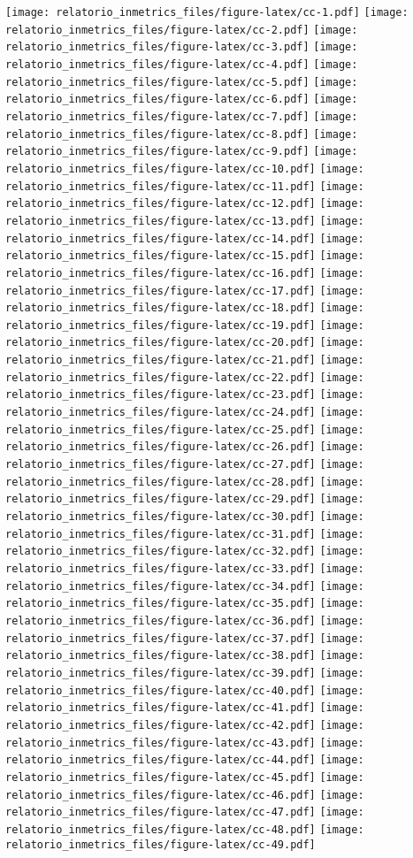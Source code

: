 \documentclass[]{book}
\begin{document}
\texttt{[image: relatorio\_inmetrics\_files/figure-latex/cc-1.pdf]} \texttt{[image: relatorio\_inmetrics\_files/figure-latex/cc-2.pdf]} \texttt{[image: relatorio\_inmetrics\_files/figure-latex/cc-3.pdf]} \texttt{[image: relatorio\_inmetrics\_files/figure-latex/cc-4.pdf]} \texttt{[image: relatorio\_inmetrics\_files/figure-latex/cc-5.pdf]} \texttt{[image: relatorio\_inmetrics\_files/figure-latex/cc-6.pdf]} \texttt{[image: relatorio\_inmetrics\_files/figure-latex/cc-7.pdf]} \texttt{[image: relatorio\_inmetrics\_files/figure-latex/cc-8.pdf]} \texttt{[image: relatorio\_inmetrics\_files/figure-latex/cc-9.pdf]} \texttt{[image: relatorio\_inmetrics\_files/figure-latex/cc-10.pdf]} \texttt{[image: relatorio\_inmetrics\_files/figure-latex/cc-11.pdf]} \texttt{[image: relatorio\_inmetrics\_files/figure-latex/cc-12.pdf]} \texttt{[image: relatorio\_inmetrics\_files/figure-latex/cc-13.pdf]} \texttt{[image: relatorio\_inmetrics\_files/figure-latex/cc-14.pdf]} \texttt{[image: relatorio\_inmetrics\_files/figure-latex/cc-15.pdf]} \texttt{[image: relatorio\_inmetrics\_files/figure-latex/cc-16.pdf]} \texttt{[image: relatorio\_inmetrics\_files/figure-latex/cc-17.pdf]} \texttt{[image: relatorio\_inmetrics\_files/figure-latex/cc-18.pdf]} \texttt{[image: relatorio\_inmetrics\_files/figure-latex/cc-19.pdf]} \texttt{[image: relatorio\_inmetrics\_files/figure-latex/cc-20.pdf]} \texttt{[image: relatorio\_inmetrics\_files/figure-latex/cc-21.pdf]} \texttt{[image: relatorio\_inmetrics\_files/figure-latex/cc-22.pdf]} \texttt{[image: relatorio\_inmetrics\_files/figure-latex/cc-23.pdf]} \texttt{[image: relatorio\_inmetrics\_files/figure-latex/cc-24.pdf]} \texttt{[image: relatorio\_inmetrics\_files/figure-latex/cc-25.pdf]} \texttt{[image: relatorio\_inmetrics\_files/figure-latex/cc-26.pdf]} \texttt{[image: relatorio\_inmetrics\_files/figure-latex/cc-27.pdf]} \texttt{[image: relatorio\_inmetrics\_files/figure-latex/cc-28.pdf]} \texttt{[image: relatorio\_inmetrics\_files/figure-latex/cc-29.pdf]} \texttt{[image: relatorio\_inmetrics\_files/figure-latex/cc-30.pdf]} \texttt{[image: relatorio\_inmetrics\_files/figure-latex/cc-31.pdf]} \texttt{[image: relatorio\_inmetrics\_files/figure-latex/cc-32.pdf]} \texttt{[image: relatorio\_inmetrics\_files/figure-latex/cc-33.pdf]} \texttt{[image: relatorio\_inmetrics\_files/figure-latex/cc-34.pdf]} \texttt{[image: relatorio\_inmetrics\_files/figure-latex/cc-35.pdf]} \texttt{[image: relatorio\_inmetrics\_files/figure-latex/cc-36.pdf]} \texttt{[image: relatorio\_inmetrics\_files/figure-latex/cc-37.pdf]} \texttt{[image: relatorio\_inmetrics\_files/figure-latex/cc-38.pdf]} \texttt{[image: relatorio\_inmetrics\_files/figure-latex/cc-39.pdf]} \texttt{[image: relatorio\_inmetrics\_files/figure-latex/cc-40.pdf]} \texttt{[image: relatorio\_inmetrics\_files/figure-latex/cc-41.pdf]} \texttt{[image: relatorio\_inmetrics\_files/figure-latex/cc-42.pdf]} \texttt{[image: relatorio\_inmetrics\_files/figure-latex/cc-43.pdf]} \texttt{[image: relatorio\_inmetrics\_files/figure-latex/cc-44.pdf]} \texttt{[image: relatorio\_inmetrics\_files/figure-latex/cc-45.pdf]} \texttt{[image: relatorio\_inmetrics\_files/figure-latex/cc-46.pdf]} \texttt{[image: relatorio\_inmetrics\_files/figure-latex/cc-47.pdf]} \texttt{[image: relatorio\_inmetrics\_files/figure-latex/cc-48.pdf]} \texttt{[image: relatorio\_inmetrics\_files/figure-latex/cc-49.pdf]} 
\end{document}
